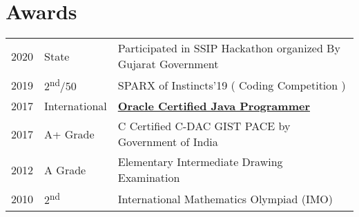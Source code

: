 \documentclass[]{deedy-resume-openfont}
\begin{document}
\begin{minipage}[t]{0.66\textwidth}




\section{Awards} 
\begin{tabular}{rll}
2020	  &State    & Participated in SSIP Hackathon organized By Gujarat Government\\
2019	  &2\textsuperscript{nd}/50   & SPARX of Instincts’19 ( Coding Competition ) \\
2017	     & International  & \href{https://www.credly.com/badges/f9998842-1285-4c07-a515-8f45c765866c/linked_in_profile}{\bf Oracle Certified Java Programmer}\\
2017     & A+ Grade  & C Certified C-DAC GIST PACE by Government of India  \\
2012     & A Grade  & Elementary Intermediate Drawing Examination\\
2010     & 2\textsuperscript{nd} & International Mathematics Olympiad (IMO) \\
\end{tabular}
\sectionsep


% 
% 

\end{minipage} 
\end{document}
